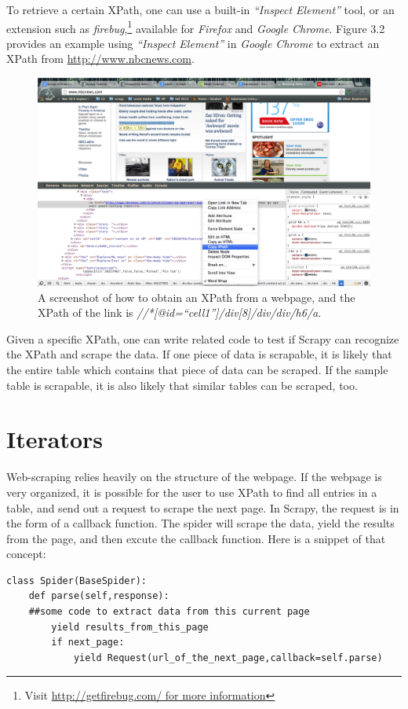 \documentclass[12pt]{report}
\begin{document}
To retrieve a certain XPath, one can use a built-in \textit{``Inspect Element''} tool, or an extension such as \textit{firebug},\footnote{Visit \url{http://getfirebug.com/ for more information}} available for \textit{Firefox} and \textit{Google Chrome}. Figure 3.2 provides an example using \textit{``Inspect Element''} in \textit{Google Chrome} to extract an XPath from \url{http://www.nbcnews.com}.\\
\begin{figure}[htp]
\includegraphics[width=\textwidth]{XPath_example.png}
\caption[How to extract XPath]
{A screenshot of how to obtain an XPath from a webpage, and the XPath of the link is \textit{//*[@id=``cell1'']/div[8]/div/div/h6/a}.}
\end{figure}
Given a specific XPath, one can write related code to test if Scrapy can recognize the XPath and scrape the data. If one piece of data is scrapable, it is likely that the entire table which contains that piece of data can be scraped. If the sample table is scrapable, it is also likely that similar tables can be scraped, too.
\newpage
\section{Iterators}

Web-scraping relies heavily on the structure of the webpage. If the webpage is very organized, it is possible for the user to use XPath to find all entries in a table, and send out a request to scrape the next page. In Scrapy, the request is in the form of a callback function. The spider will scrape the data, yield the results from the page, and then excute the callback function. Here is a snippet of that concept:
\begin{lstlisting}
class Spider(BaseSpider):
	def parse(self,response):
	##some code to extract data from this current page
		yield results_from_this_page
		if next_page:
			yield Request(url_of_the_next_page,callback=self.parse)
\end{lstlisting}
\end{document}
